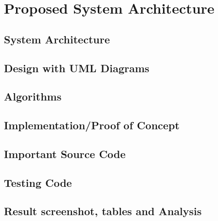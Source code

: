 \chapter{Proposed System Architecture}

\section{System Architecture }

\section{Design with UML Diagrams}

\section{Algorithms}

\section{Implementation/Proof of Concept}

\section{Important Source Code}

\section{Testing Code}

\section{Result screenshot, tables and Analysis}

